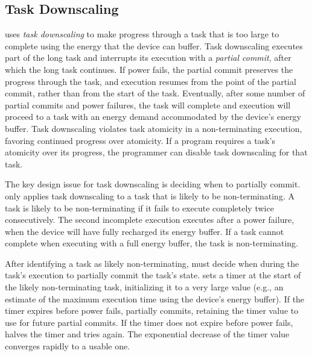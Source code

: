 \subsection{Task Downscaling}
\label{sec:task_downsizing}

\sys uses {\em task downscaling} to make progress through a task that is too large to complete using the energy that the device can buffer. Task downscaling executes part of the long task and interrupts its execution with a {\em partial commit}, after which the long task continues. If power fails, the partial commit preserves the progress through the task, and execution resumes from the point of the partial commit, rather than from the start of the task. Eventually, after some number of partial commits and power failures, the task will complete and execution will proceed to a task with an energy demand accommodated by the device's energy buffer. Task downscaling violates task atomicity in a non-terminating execution, favoring continued progress over atomicity. If a program requires a task's atomicity over its progress,  the programmer can disable task downscaling for that task.

The key design issue for task downscaling is deciding when to partially commit. \sys only applies task downscaling to a task that is likely to be non-terminating.  A task is likely to be non-terminating if it fails to execute completely twice consecutively. The second incomplete execution executes after a power failure, when the device will have fully recharged its energy buffer. If a task cannot complete when executing with a full energy buffer, the task is non-terminating.

After identifying a task as likely non-terminating, \sys must decide when during the task's execution to partially commit the task's state. \sys sets a timer at the start of the likely non-terminating task, initializing it to a very large value (e.g., an estimate of the maximum execution time using the device's energy buffer). If the timer expires before power fails, \sys partially commits, retaining  the timer value to use for future partial commits. If the timer does not expire before power fails, \sys halves the timer and tries again. The exponential decrease of the timer value converges rapidly to a usable one.